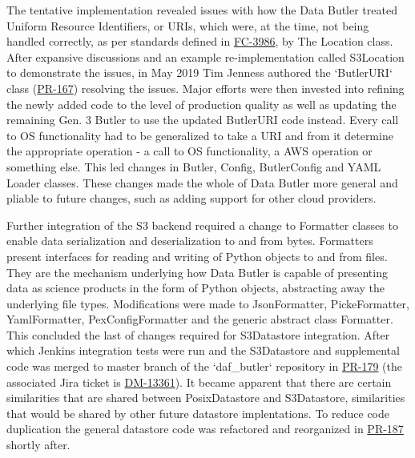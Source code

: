 The tentative implementation revealed issues with how the Data Butler treated Uniform Resource Identifiers, or URIs, which were, at the time, not being handled correctly, as per standards defined in \href{https://tools.ietf.org/html/rfc3986}{FC-3986}, by The Location class. After expansive discussions and an example re-implementation called S3Location to demonstrate the issues, in May 2019 Tim Jenness authored the `ButlerURI` class (\href{https://github.com/lsst/daf_butler/pull/167}{PR-167}) resolving the issues. Major efforts were then invested into refining the newly added code to the level of production quality as well as updating the remaining Gen. 3 Butler to use the updated ButlerURI code instead. Every call to OS functionality had to be generalized to take a URI and from it determine the appropriate operation - a call to OS functionality, a AWS operation or something else. This led changes in Butler, Config, ButlerConfig and YAML Loader classes. These changes made the whole of Data Butler more general and pliable to future changes, such as adding support for other cloud providers. 

Further integration of the S3 backend required a change to Formatter classes to enable data serialization and deserialization to and from bytes. Formatters present interfaces for reading and writing of Python objects to and from files. They are the mechanism underlying how Data Butler is capable of presenting data as science products in the form of Python objects, abstracting away the underlying file types. Modifications were made to JsonFormatter, PickeFormatter, YamlFormatter, PexConfigFormatter and the generic abstract class Formatter. This concluded the last of changes required for S3Datastore integration. After which Jenkins integration tests were run and the S3Datastore and supplemental code was merged to master branch of the `daf\_butler` repository in \href{https://github.com/lsst/daf_butler/pull/179}{PR-179} (the associated Jira ticket is \href{https://jira.lsstcorp.org/browse/DM-13361}{DM-13361}). It became apparent that there are certain similarities that are shared between PosixDatastore and S3Datastore, similarities that would be shared by other future datastore implentations. To reduce code duplication the general datastore code was refactored and reorganized in \href{https://github.com/lsst/daf_butler/pull/187}{PR-187} shortly after. 

